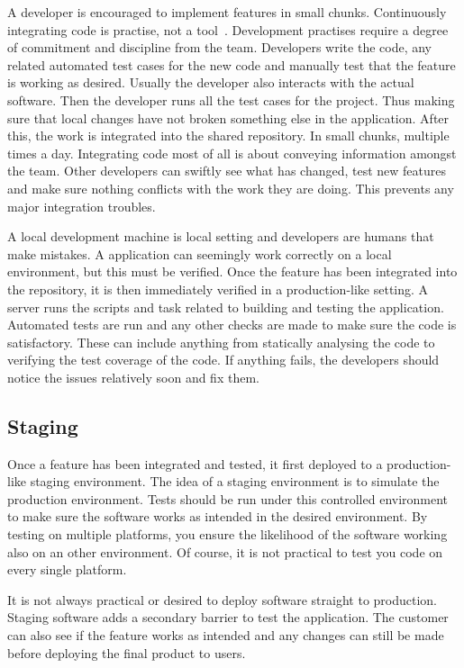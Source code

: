 \documentclass[english]{tktltiki2}
\begin{document}
A developer is encouraged to implement features in small chunks. Continuously integrating code is practise, not a tool~\cite{HF11}. Development practises require a degree of commitment and discipline from the team. Developers write the code, any related automated test cases for the new code and manually test that the feature is working as desired. Usually the developer also interacts with the actual software. Then the developer runs all the test cases for the project. Thus making sure that local changes have not broken something else in the application. After this, the work is integrated into the shared repository. In small chunks, multiple times a day. Integrating code most of all is about conveying information amongst the team. Other developers can swiftly see what has changed, test new features and make sure nothing conflicts with the work they are doing. This prevents any major integration troubles.

A local development machine is local setting and developers are humans that make mistakes. A application can seemingly work correctly on a local environment, but this must be verified. Once the feature has been integrated into the repository, it is then immediately verified in a production-like setting. A server runs the scripts and task related to building and testing the application. Automated tests are run and any other checks are made to make sure the code is satisfactory. These can include anything from statically analysing the code to verifying the test coverage of the code. If anything fails, the developers should notice the issues relatively soon and fix them.

\subsection{Staging}

Once a feature has been integrated and tested, it first deployed to a production-like staging environment. The idea of a staging environment is to simulate the production environment. Tests should be run under this controlled environment to make sure the software works as intended in the desired environment. By testing on multiple platforms, you ensure the likelihood of the software working also on an other environment. Of course, it is not practical to test you code on every single platform.

It is not always practical or desired to deploy software straight to production. Staging software adds a secondary barrier to test the application. The customer can also see if the feature works as intended and any changes can still be made before deploying the final product to users.
\end{document}
